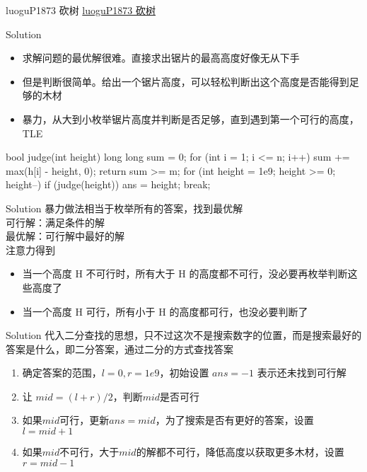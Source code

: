 \documentclass[aspectratio=169,xcolor=dvipsnames]{beamer}
\begin{document}
\begin{frame}{luoguP1873 砍树}
    \href{https://www.luogu.com.cn/problem/P1873}{luoguP1873 砍树}
\end{frame}

\begin{frame}[fragile]{Solution}
    \begin{itemize}
        \item 求解问题的最优解很难。直接求出锯片的最高高度好像无从下手
        \item 但是判断很简单。给出一个锯片高度，可以轻松判断出这个高度是否能得到足够的木材
        \item 暴力，从大到小枚举锯片高度并判断是否足够，直到遇到第一个可行的高度，TLE
    \end{itemize}

    \begin{cppcode}
    bool judge(int height) {
        long long sum = 0;
        for (int i = 1; i <= n; i++)
            sum += max(h[i] - height, 0);
        return sum >= m;
    }
    for (int height = 1e9; height >= 0; height--) {
        if (judge(height)) {
            ans = height;
            break;
        }
    }
    \end{cppcode}
\end{frame}

\begin{frame}[fragile]{Solution}
    暴力做法相当于枚举所有的答案，找到最优解\\
    可行解：满足条件的解\\
    最优解：可行解中最好的解\\
    注意力得到
    \begin{itemize}
        \item 当一个高度 H 不可行时，所有大于 H 的高度都不可行，没必要再枚举判断这些高度了
        \item 当一个高度 H 可行，所有小于 H 的高度都可行，也没必要判断了
    \end{itemize}
\end{frame}

\begin{frame}[fragile]{Solution}
    代入二分查找的思想，只不过这次不是搜索数字的位置，而是搜索最好的答案是什么，即二分答案，通过二分的方式查找答案
    \begin{enumerate}
        \item 确定答案的范围，$l=0,r=1e9$，初始设置 $ans=-1$ 表示还未找到可行解
        \item 让 $mid=(l+r)/2$，判断$mid$是否可行
        \item 如果$mid$可行，更新$ans=mid$，为了搜索是否有更好的答案，设置$l=mid+1$
        \item 如果$mid$不可行，大于$mid$的解都不可行，降低高度以获取更多木材，设置$r=mid-1$
    \end{enumerate}
\end{frame}
\end{document}

